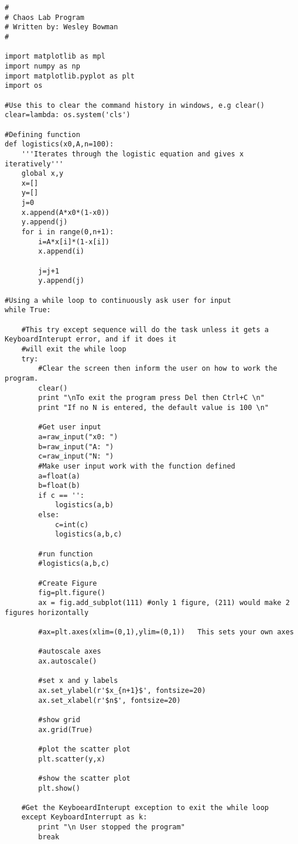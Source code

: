 \documentclass[12pt]{report}
\theoremstyle{definition}
\begin{document}
\begin{lstlisting}
#
# Chaos Lab Program
# Written by: Wesley Bowman
# 

import matplotlib as mpl
import numpy as np
import matplotlib.pyplot as plt
import os

#Use this to clear the command history in windows, e.g clear()
clear=lambda: os.system('cls')

#Defining function
def logistics(x0,A,n=100):
	'''Iterates through the logistic equation and gives x iteratively'''
	global x,y
	x=[]
	y=[]
	j=0
	x.append(A*x0*(1-x0))
	y.append(j)
	for i in range(0,n+1):
		i=A*x[i]*(1-x[i])
		x.append(i)
		
		j=j+1
		y.append(j)

#Using a while loop to continuously ask user for input
while True:

	#This try except sequence will do the task unless it gets a KeyboardInterupt error, and if it does it
	#will exit the while loop
	try:
		#Clear the screen then inform the user on how to work the program.
		clear()
		print "\nTo exit the program press Del then Ctrl+C \n"
		print "If no N is entered, the default value is 100 \n"
		
		#Get user input
		a=raw_input("x0: ")
		b=raw_input("A: ")
		c=raw_input("N: ")
		#Make user input work with the function defined
		a=float(a)
		b=float(b)
		if c == '':
			logistics(a,b)
		else:
			c=int(c)
			logistics(a,b,c)

		#run function
		#logistics(a,b,c)

		#Create Figure
		fig=plt.figure()
		ax = fig.add_subplot(111) #only 1 figure, (211) would make 2 figures horizontally

		#ax=plt.axes(xlim=(0,1),ylim=(0,1))   This sets your own axes

		#autoscale axes
		ax.autoscale()

		#set x and y labels
		ax.set_ylabel(r'$x_{n+1}$', fontsize=20)
		ax.set_xlabel(r'$n$', fontsize=20)

		#show grid
		ax.grid(True)

		#plot the scatter plot
		plt.scatter(y,x)

		#show the scatter plot
		plt.show()
	
	#Get the KeyboeardInterupt exception to exit the while loop
	except KeyboardInterrupt as k:
		print "\n User stopped the program"
		break
	

\end{lstlisting}
\end{document}
